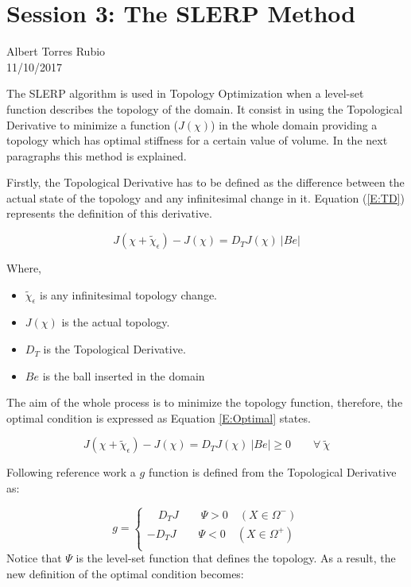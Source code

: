 
\section{Session 3: The SLERP Method}

\begin{center}
Albert Torres Rubio \\
11/10/2017
\end{center}

The SLERP algorithm is used in Topology Optimization when a level-set function describes the topology of the domain. It consist in using the Topological Derivative to minimize a function ($J(\chi)$) in the whole domain providing a topology which has optimal stiffness for a certain value of volume. In the next paragraphs this method is explained.

Firstly, the Topological Derivative has to be defined as the difference between the actual state of the topology and any infinitesimal change in it. Equation (\ref{E:TD}) represents the definition of this derivative.

\begin{equation}  \label{E:TD}
J\left(\chi + \tilde{\chi}_\epsilon\right)-J(\chi)=D_TJ(\chi) \: |Be| 
\end{equation}

Where,
\begin{itemize}
\item $\tilde{\chi}_\epsilon$ is any infinitesimal topology change.
\item $J(\chi)$ is the actual topology.
\item $D_T$ is the Topological Derivative.
\item $Be$ is the ball inserted in the domain
\end{itemize}

The aim of the whole process is to minimize the topology function, therefore, the optimal condition is expressed as Equation \ref{E:Optimal} states.

\begin{equation}  \label{E:Optimal}
J\left(\chi + \tilde{\chi}_\epsilon\right)-J(\chi)=D_TJ(\chi) \: |Be| \geq 0  \qquad \forall \:\tilde{\chi}
\end{equation}

Following reference work a $g$ function is defined from the Topological Derivative as:

\begin{equation}  \label{E:g}
g=\left\{ 
\begin{array}{c}
\quad D_TJ \qquad \Psi > 0 \quad (X \in \Omega^-) \\
-D_TJ \qquad \Psi < 0 \quad (X \in \Omega^+) \\
\end{array} \right.
\end{equation}
Notice that $\Psi$ is the level-set function that defines the topology. As a result, the new definition of the optimal condition becomes:

